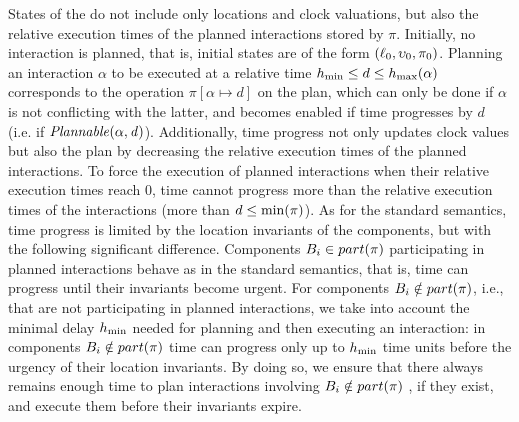 States of the \lpsabrb do not include only locations and clock valuations, 
but also the relative execution times of the planned interactions stored by $\pi$.
Initially, no interaction is planned, that is, initial states are of the form 
$(\ell_0,\upsilon_0,\pi_0)$.
Planning an interaction $\alpha$ to be executed at a relative time $h_{\min}\le d\le h_{\max}
(\alpha)$ corresponds to the operation $\pi [ \alpha\mapsto d  ]$ on the plan, 
which can only be done if $\alpha$ is not conflicting with the latter, and becomes enabled if 
time progresses by $d$ (i.e. if $\mathit{Plannable(\alpha,d)}$).
Additionally, time progress not only updates clock values but also the plan by 
decreasing the relative execution times of the planned interactions.
To force the execution of planned interactions when their relative execution times reach $0$, 
time cannot progress more than the relative execution times of the interactions 
(more than $d \le \min(\pi)$).
As for the standard semantics, time progress is limited by the location invariants 
of the components, but with the following significant difference.
Components $B_i \in part(\pi)$ participating in planned interactions behave as in the standard 
semantics, that is, time can progress until their invariants become urgent.
For components $B_i \notin part(\pi)$, i.e., that are not participating in planned interactions, 
we take into account the minimal delay $h_{\min}$ needed for planning and then executing an 
interaction: in components $B_i \notin part(\pi)$ time can progress only up to $h_{\min}$ time 
units before the urgency of their location invariants.
By doing so, we ensure that there always remains enough time to plan interactions involving 
$B_i \notin part(\pi)$ , if they exist, and execute them before their invariants 
expire.
 
